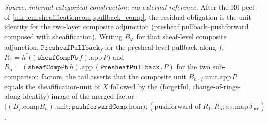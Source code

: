 \begin{lemma}
  \label{mk-lem:sheafificationcomppullback_comp_tail}
  \lean{}
  \textit{Source: internal categorical construction; no external reference.}
  After the R0-peel of \ref{mk-lem:sheafificationcomppullback_comp}, the residual obligation is
  the unit identity for the two-layer composite adjunction (presheaf pullback--pushforward
  composed with sheafification). Writing \(B_\varphi\) for that sheaf-level composite
  adjunction, \(\mathtt{PresheafPullback}_f\) for the presheaf-level pullback along \(f\),
  \(R_1 = h^*\bigl((\mathtt{sheafCompPb}\,f).\mathrm{app}\,P\bigr)\) and
  \(R_5 = (\mathtt{sheafCompPb}\,h).\mathrm{app}\,(\mathtt{PresheafPullback}_f\,P)\) for the two
  sub-comparison factors, the tail asserts that the composite unit
  \(B_{h \circ f}.\mathrm{unit}.\mathrm{app}\,P\) equals the sheafification-unit of \(X\)
  followed by the (forgetful, change-of-rings-along-identity) image of the merged factor
  \(\bigl((B_f \mathbin{.\mathrm{comp}} B_h).\mathrm{unit} \mathbin{;}
  \mathtt{pushforwardComp}.\mathrm{hom}\bigr) \mathbin{;} (\text{pushforward of } R_1 \mathbin{;}
  R_5 \mathbin{;} a_Z.\mathrm{map}\,\delta_{\mathrm{pre}})\).
\end{lemma}
